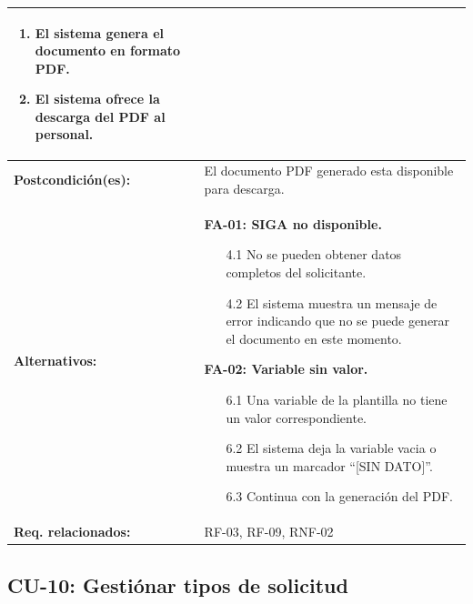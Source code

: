 \begin{longtable}{|L{4cm}|L{9.5cm}|}
\begin{enumerate}[nosep, leftmargin=*]
        \item El sistema genera el documento en formato PDF.
        \item El sistema ofrece la descarga del PDF al personal.
    \end{enumerate} \\
    \hline
    \textbf{Postcondición(es):} & El documento PDF generado esta disponible para descarga. \\
    \hline
    \textbf{Alternativos:} &
    \textbf{FA-01: SIGA no disponible.}
    \begin{enumerate}[nosep, leftmargin=*]
        \item[4.1] No se pueden obtener datos completos del solicitante.
        \item[4.2] El sistema muestra un mensaje de error indicando que no se puede generar el documento en este momento.
    \end{enumerate}
    \vspace{0.2cm}
    \textbf{FA-02: Variable sin valor.}
    \begin{enumerate}[nosep, leftmargin=*]
        \item[6.1] Una variable de la plantilla no tiene un valor correspondiente.
        \item[6.2] El sistema deja la variable vacia o muestra un marcador ``[SIN DATO]''.
        \item[6.3] Continua con la generación del PDF.
    \end{enumerate} \\
    \hline
    \textbf{Req. relacionados:} & RF-03, RF-09, RNF-02 \\
    \hline
\end{longtable}

\subsection{CU-10: Gestiónar tipos de solicitud}

